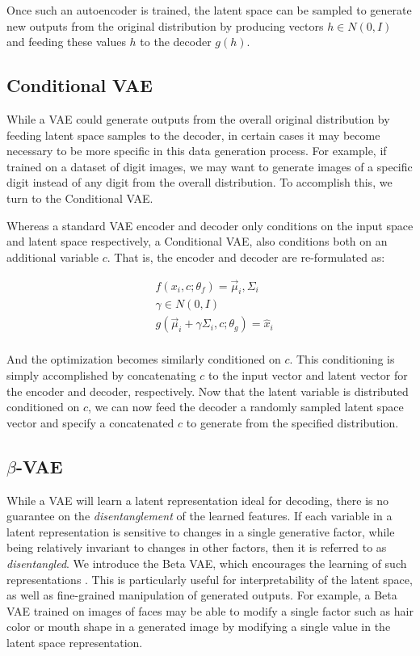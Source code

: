 Once such an autoencoder is trained, the latent space can be sampled
to generate new outputs from the original distribution by producing
vectors $h \in N(0,I)$ and feeding these values $h$ to the decoder
$g(h)$.%

\subsection{Conditional VAE}

While a VAE could generate outputs from the overall original
distribution by feeding latent space samples to the decoder, in
certain cases it may become necessary to be more specific in this
data generation process. For example, if trained on a dataset of
digit images, we may want to generate images of a specific digit
instead of any digit from the overall distribution. To accomplish
this, we turn to the Conditional VAE.

Whereas a standard VAE encoder and decoder only conditions on the
input space and latent space respectively, a Conditional VAE, also
conditions both on an additional variable $c$. That is, the encoder
and decoder are re-formulated as:

\begin{align*}
    &f(x_i, c ;\theta_f) = \vec{\mu}_i, \Sigma_i \\
    &\gamma \in N(0,I) \\
    &g(\vec{\mu}_i + \gamma \Sigma_i, c; \theta_g) = \hat{x}_i \\
\end{align*}

And the optimization becomes similarly conditioned on $c$. This
conditioning is simply accomplished by concatenating $c$ to the input
vector and latent vector for the encoder and decoder, respectively.
Now that the latent variable is distributed conditioned on $c$, we
can now feed the decoder a randomly sampled latent space vector and
specify a concatenated $c$ to generate from the specified
distribution.

\subsection{$\beta$-VAE}

While a VAE will learn a latent representation ideal for decoding,
there is no guarantee on the \textit{disentanglement} of the learned
features. If each variable in a latent representation is sensitive to
changes in a single generative factor, while being relatively
invariant to changes in other factors, then it is referred to as
\textit{disentangled}. We introduce the Beta VAE, which encourages
the learning of such representations \cite{higgins2017beta}. This is
particularly useful for interpretability of the latent space, as well
as fine-grained manipulation of generated outputs. For example, a
Beta VAE trained on images of faces may be able to modify a single
factor such as hair color or mouth shape in a generated image by
modifying a single value in the latent space representation.

